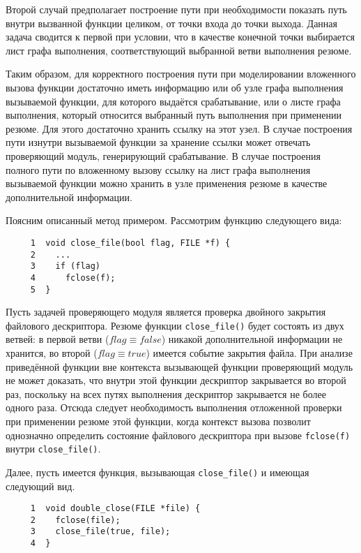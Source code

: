 Второй случай предполагает построение пути при необходимости показать путь внутри вызванной функции целиком, от точки входа до точки выхода. Данная задача сводится к первой при условии, что в качестве конечной точки выбирается лист графа выполнения, соответствующий выбранной ветви выполнения резюме.

Таким образом, для корректного построения пути при моделировании вложенного вызова функции достаточно иметь информацию или об узле графа выполнения вызываемой функции, для которого выдаётся срабатывание, или о листе графа выполнения, который относится выбранный путь выполнения при применении резюме. Для этого достаточно хранить ссылку на этот узел. В случае построения пути изнутри вызываемой функции за хранение ссылки может отвечать проверяющий модуль, генерирующий срабатывание. В случае построения полного пути по вложенному вызову ссылку на лист графа выполнения вызываемой функции можно хранить в узле применения резюме в качестве дополнительной информации.

Поясним описанный метод примером. Рассмотрим функцию следующего вида:

\begin{verbatim}
     1  void close_file(bool flag, FILE *f) {
     2    ...
     3    if (flag)
     4      fclose(f);
     5  }
\end{verbatim}

Пусть задачей проверяющего модуля является проверка двойного закрытия файлового дескриптора. Резюме функции \texttt{close\_file()} будет состоять из двух ветвей: в первой ветви ($flag \equiv false$) никакой дополнительной информации не хранится, во второй ($flag \equiv true$) имеется событие закрытия файла. При анализе приведённой функции вне контекста вызывающей функции проверяющий модуль не может доказать, что внутри этой функции дескриптор закрывается во второй раз, поскольку на всех путях выполнения дескриптор закрывается не более одного раза. Отсюда следует необходимость выполнения отложенной проверки при применении резюме этой функции, когда контекст вызова позволит однозначно определить состояние файлового дескриптора при вызове \texttt{fclose(f)} внутри \texttt{close\_file()}.

Далее, пусть имеется функция, вызывающая \texttt{close\_file()} и имеющая следующий вид.

\begin{verbatim}
     1  void double_close(FILE *file) {
     2    fclose(file);
     3    close_file(true, file);
     4  }
\end{verbatim}

